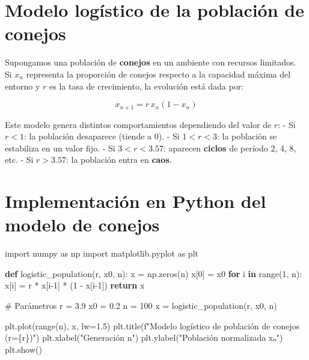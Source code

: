 \documentclass[
  letterpaper,
  DIV=11,
  numbers=noendperiod]{scrreprt}
\newenvironment{Shaded}{\begin{snugshade}}{\end{snugshade}}
\newcommand{\BuiltInTok}[1]{\textcolor[rgb]{0.00,0.23,0.31}{#1}}
\newcommand{\CommentTok}[1]{\textcolor[rgb]{0.37,0.37,0.37}{#1}}
\newcommand{\ControlFlowTok}[1]{\textcolor[rgb]{0.00,0.23,0.31}{\textbf{#1}}}
\newcommand{\DecValTok}[1]{\textcolor[rgb]{0.68,0.00,0.00}{#1}}
\newcommand{\FloatTok}[1]{\textcolor[rgb]{0.68,0.00,0.00}{#1}}
\newcommand{\ImportTok}[1]{\textcolor[rgb]{0.00,0.46,0.62}{#1}}
\newcommand{\KeywordTok}[1]{\textcolor[rgb]{0.00,0.23,0.31}{\textbf{#1}}}
\newcommand{\NormalTok}[1]{\textcolor[rgb]{0.00,0.23,0.31}{#1}}
\newcommand{\OperatorTok}[1]{\textcolor[rgb]{0.37,0.37,0.37}{#1}}
\newcommand{\SpecialCharTok}[1]{\textcolor[rgb]{0.37,0.37,0.37}{#1}}
\newcommand{\SpecialStringTok}[1]{\textcolor[rgb]{0.13,0.47,0.30}{#1}}
\newcommand{\StringTok}[1]{\textcolor[rgb]{0.13,0.47,0.30}{#1}}
\begin{document}
\section{Modelo logístico de la población de
conejos}\label{modelo-loguxedstico-de-la-poblaciuxf3n-de-conejos}

Supongamos una población de \textbf{conejos} en un ambiente con recursos
limitados.\\
Si \(x_n\) representa la proporción de conejos respecto a la capacidad
máxima del entorno y \(r\) es la tasa de crecimiento, la evolución está
dada por:

\[
x_{n+1} = r\,x_n(1 - x_n)
\]

Este modelo genera distintos comportamientos dependiendo del valor de
\(r\): - Si \(r < 1\): la población desaparece (tiende a 0). - Si
\(1 < r < 3\): la población se estabiliza en un valor fijo. - Si
\(3 < r < 3.57\): aparecen \textbf{ciclos} de período 2, 4, 8, etc. - Si
\(r > 3.57\): la población entra en \textbf{caos}.

\section{Implementación en Python del modelo de
conejos}\label{implementaciuxf3n-en-python-del-modelo-de-conejos}

\begin{Shaded}
\begin{Highlighting}[]
\ImportTok{import}\NormalTok{ numpy }\ImportTok{as}\NormalTok{ np}
\ImportTok{import}\NormalTok{ matplotlib.pyplot }\ImportTok{as}\NormalTok{ plt}

\KeywordTok{def}\NormalTok{ logistic\_population(r, x0, n):}
\NormalTok{    x }\OperatorTok{=}\NormalTok{ np.zeros(n)}
\NormalTok{    x[}\DecValTok{0}\NormalTok{] }\OperatorTok{=}\NormalTok{ x0}
    \ControlFlowTok{for}\NormalTok{ i }\KeywordTok{in} \BuiltInTok{range}\NormalTok{(}\DecValTok{1}\NormalTok{, n):}
\NormalTok{        x[i] }\OperatorTok{=}\NormalTok{ r }\OperatorTok{*}\NormalTok{ x[i}\OperatorTok{{-}}\DecValTok{1}\NormalTok{] }\OperatorTok{*}\NormalTok{ (}\DecValTok{1} \OperatorTok{{-}}\NormalTok{ x[i}\OperatorTok{{-}}\DecValTok{1}\NormalTok{])}
    \ControlFlowTok{return}\NormalTok{ x}

\CommentTok{\# Parámetros}
\NormalTok{r }\OperatorTok{=} \FloatTok{3.9}
\NormalTok{x0 }\OperatorTok{=} \FloatTok{0.2}
\NormalTok{n }\OperatorTok{=} \DecValTok{100}
\NormalTok{x }\OperatorTok{=}\NormalTok{ logistic\_population(r, x0, n)}

\NormalTok{plt.plot(}\BuiltInTok{range}\NormalTok{(n), x, lw}\OperatorTok{=}\FloatTok{1.5}\NormalTok{)}
\NormalTok{plt.title(}\SpecialStringTok{f"Modelo logístico de población de conejos (r=}\SpecialCharTok{\{}\NormalTok{r}\SpecialCharTok{\}}\SpecialStringTok{)"}\NormalTok{)}
\NormalTok{plt.xlabel(}\StringTok{"Generación n"}\NormalTok{)}
\NormalTok{plt.ylabel(}\StringTok{"Población normalizada xₙ"}\NormalTok{)}
\NormalTok{plt.show()}
\end{Highlighting}
\end{Shaded}
\end{document}
